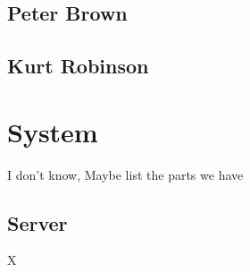 
\subsection{Peter Brown}



\subsection{Kurt Robinson}





\section{System}

I don't know, Maybe list the parts we have


\subsection{Server}

X